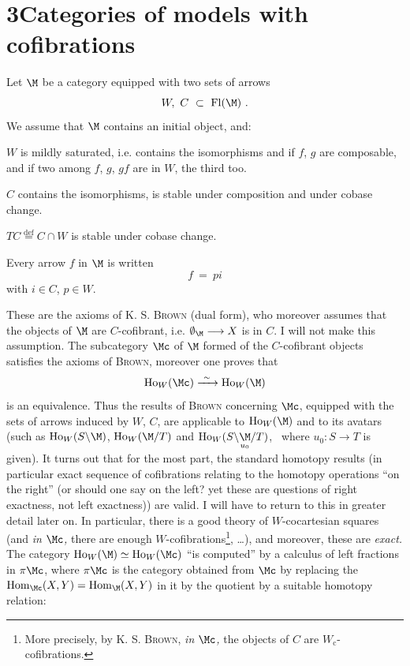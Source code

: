 \section*{3\quad Categories of models with cofibrations}

Let $\M$ be a category equipped with two sets of arrows
\[ W,\ C\ \subset\ \mathrm{Fl}(\M)\ . \]
We assume that $\M$ contains an initial object, and:
\begin{description}[leftmargin=3em, labelwidth=2.5em]
\item[Cof$_0$] $W$ is mildly saturated, i.e. contains the isomorphisms and if $f$, $g$ are composable, and if two among $f$, $g$, $gf$ are in $W$, the third too.
\item[Cof$_1$] $C$ contains the isomorphisms, is stable under composition and under cobase change.
\item[Cof$_2$] $TC \overset{\text{def}}{=} C \cap W$ is stable under cobase change.
\item[Cof$_3$] Every arrow $f$ in $\M$ is written
\[ f \ = \ pi \]
with $i \in C$, $p \in W$.
\end{description}
These are the axioms of K. S. \textsc{Brown} (dual form), who moreover assumes that the objects of $\M$ are $C$-cofibrant, i.e. $\emptyset_{\M} \longrightarrow X$ is in $C$. I will not make this assumption. The subcategory $\Mc$ of $\M$ formed of the  $C$-cofibrant objects satisfies the axioms of \textsc{Brown}, moreover one proves that
\[ \mathrm{Ho}_W(\Mc) \xrightarrow{\ \sim\ } \mathrm{Ho}_W(\M) \]
is an equivalence. Thus the results of \textsc{Brown} concerning $\Mc$, equipped with the sets of arrows induced by $W$, $C$, are applicable to $\mathrm{Ho}_W(\M)$ and to its avatars (such as $\mathrm{Ho}_W(S\backslash\M)$, $\mathrm{Ho}_W(\M/T)$ and $\mathrm{Ho}_W(S\backslash\underset{u_0}{\M}/T)$, \ where $u_0 : S \longrightarrow T$ is given). It turns out that for the most part, the standard homotopy results (in particular exact sequence of cofibrations relating to the homotopy operations ``on the right'' (or should one say on the left? yet these are questions of right exactness, not left exactness)) are valid. I will have to return to this in greater detail later on. In particular, there is a good theory of $W$-cocartesian squares (and \textit{in} $\Mc$\textit{,} there are enough $W$-cofibrations\footnote[14]{More precisely, by K. S. \textsc{Brown}, \textit{in} $\Mc$\textit{,} the objects of $C$ are $W_{\mathrm{c}}$-cofibrations.}, \ldots),
and moreover, these are \textit{exact.} The category $\mathrm{Ho}_W(\M) \simeq \mathrm{Ho}_W(\Mc)$ ``is computed'' by a calculus of left fractions in $\pi\Mc$, where $\pi\Mc$ is the category obtained from $\Mc$ by replacing the $\mathrm{Hom}_{\Mc}(X,Y) = \mathrm{Hom}_{\M}(X,Y)$ in it by the quotient by a suitable homotopy relation:
